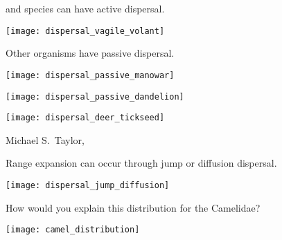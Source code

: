 \documentclass[t]{beamer}
\begin{document}
%
{
\begin{frame}[b]

\end{frame}
}
%
\begin{frame}[t]{ and  species can have active dispersal.}

	\texttt{[image: dispersal\_vagile\_volant]}
	
\end{frame}
%
\begin{frame}[t]{Other organisms have passive dispersal.}

	\begin{multicols}{2}
		\texttt{[image: dispersal\_passive\_manowar]}
		
		\columnbreak
		
		\texttt{[image: dispersal\_passive\_dandelion]}
		
	\end{multicols}
	
\end{frame}
%
\begin{frame}[t]

	{\centering
	\texttt{[image: dispersal\_deer\_tickseed]}\par
	}
	
	\vfilll
	
	\hfill \tiny Michael S.~Taylor, 
\end{frame}
%
\begin{frame}[t]{Range expansion can occur through jump or diffusion dispersal.}

	\vspace*{-0.5\baselineskip}
	{\centering
	\texttt{[image: dispersal\_jump\_diffusion]}\par
	}
	
	\vfilll
	
\end{frame}
%
\begin{frame}[t]{How would you explain this distribution for the Camelidae?}

	\vspace*{-0.5\baselineskip}
	{\centering
	\texttt{[image: camel\_distribution]}\par
	}
	
	\vfilll
	
\end{frame}
\end{document}
